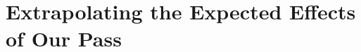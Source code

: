 \documentclass{article}
\begin{document}



\section{Extrapolating the Expected Effects of Our Pass}
\end{document}
